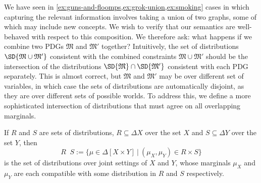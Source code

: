 \documentclass{article}
\theoremstyle{plain}
\theoremstyle{definition}
\theoremstyle{remark}
\newcommand{\notation}[2][]{#1}
\renewcommand{\notation}[2][]{{\color{notationcolor} #2}}
\DeclareMathOperator\dcap{\mathop{\dot\cap}}
\newcommand{\dg}[1]{\mathfrak{#1}}
\numberwithin{equation}{section}
\begin{document}
\begin{vfull}
	We have seen
        in \cref{ex:guns-and-floomps,ex:grok-union,ex:smoking} cases in
        which capturing the relevant information involves taking a
        union of two graphs, some of which may include new
        concepts. We wish to verify that our semantics are
        well-behaved with respect to this composition.	  
	We therefore ask: what happens if we combine two PDGs $\dg M$
        and $\dg M'$ together? Intuitively, the set of distributions
        $\SD{\dg M \cup \dg M'}$ consistent with the combined
        constraints $\dg M\cup \dg M'$ should be the intersection of the
        distributions $\SD{\dg M} \cap \SD{\dg M'}$ consistent
        with each PDG separately. This is almost correct, but $\dg M$
        and $\dg M'$ may be over different set of variables, in which
        case the sets of distributions are automatically disjoint, as
        they are over different sets of possible worlds. To address
        this, we define a more sophisticated intersection of
        distributions that must agree on all overlapping
        marginals. %
	
	\begin{defn}[$\dcap$]\label{def:marginal-dist-intersection}
		If $R$ and $S$ are sets of distributions, $R \subseteq \Delta X$ over the set $X$ and $S\subseteq \Delta Y$ over the set $Y$, then
			{$$R \dcap S := \Big\{ \mu \in  \Delta [X \!\times\! Y] ~\Big|~ (\mu_{X}, \mu_{Y}) \in R \times S \Big\}  $$}%
		is the set of distributions over joint settings of $X$ and $Y$, whose marginals $\mu_X$ and $\mu_Y$ are each compatible with some distribution in $R$ and $S$ respectively. 
		

\end{defn}
\end{vfull}
\end{document}
